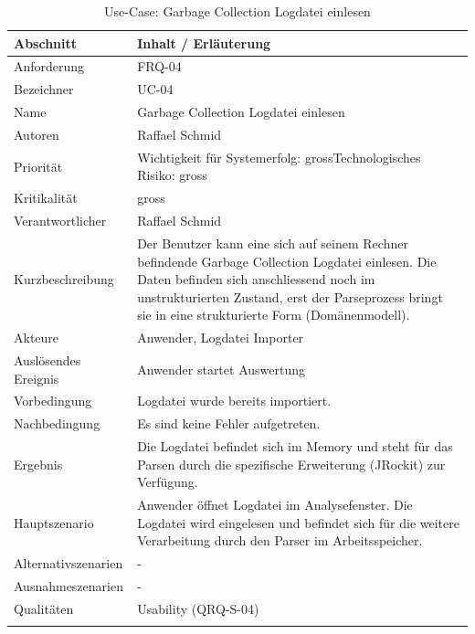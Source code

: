\begin{longtable}{|p{4cm}|p{10.5cm}|}
\hline
   \textbf{Abschnitt} & \textbf{Inhalt / Erläuterung} \\\hline
   Anforderung & FRQ-04\\\hline
   Bezeichner & UC-04\\\hline
   Name & Garbage Collection Logdatei einlesen\\\hline
   Autoren & Raffael Schmid\\\hline
   Priorität & Wichtigkeit für Systemerfolg: gross\newline Technologisches Risiko: gross\\\hline
   Kritikalität & gross\\\hline
   Verantwortlicher & Raffael Schmid\\\hline
   Kurzbeschreibung & Der Benutzer kann eine sich auf seinem Rechner befindende Garbage Collection Logdatei einlesen. Die Daten befinden sich anschliessend noch im unstrukturierten Zustand, erst der Parseprozess bringt sie in eine strukturierte Form (Domänenmodell).\\\hline
   Akteure & Anwender, Logdatei Importer\\\hline
   Auslösendes Ereignis & Anwender startet Auswertung\\\hline
   Vorbedingung & Logdatei wurde bereits importiert.\\\hline
   Nachbedingung & Es sind keine Fehler aufgetreten.\\\hline
   Ergebnis & Die Logdatei befindet sich im Memory und steht für das Parsen durch die spezifische Erweiterung (JRockit) zur Verfügung.\\\hline
   Hauptszenario & Anwender öffnet Logdatei im Analysefenster. Die Logdatei wird eingelesen und befindet sich für die weitere Verarbeitung durch den Parser im Arbeitsspeicher.\\\hline
   Alternativszenarien & -\\\hline
   Ausnahmeszenarien & -\\\hline
   Qualitäten & Usability (QRQ-S-04)\\\hline
\caption{Use-Case: Garbage Collection Logdatei einlesen}
\end{longtable}

